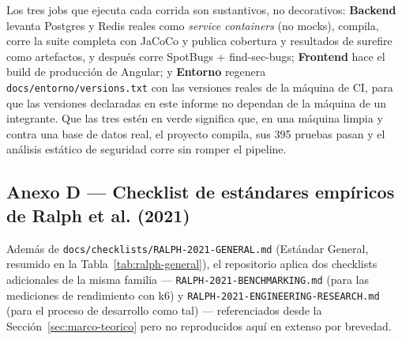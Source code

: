 Los tres jobs que ejecuta cada corrida son sustantivos, no decorativos: \textbf{Backend} levanta
Postgres y Redis reales como \textit{service containers} (no mocks), compila, corre la suite completa
con JaCoCo y publica cobertura y resultados de surefire como artefactos, y después corre SpotBugs +
find-sec-bugs; \textbf{Frontend} hace el build de producción de Angular; y \textbf{Entorno} regenera
\texttt{docs/entorno/versions.txt} con las versiones reales de la máquina de CI, para que las versiones
declaradas en este informe no dependan de la máquina de un integrante. Que las tres estén en verde
significa que, en una máquina limpia y contra una base de datos real, el proyecto compila, sus 395
pruebas pasan y el análisis estático de seguridad corre sin romper el pipeline.

\subsection{Anexo D --- Checklist de estándares empíricos de Ralph et al. (2021)}
\label{anexo:ralph}

Además de \texttt{docs/checklists/RALPH-2021-GENERAL.md} (Estándar General, resumido en la
Tabla~\ref{tab:ralph-general}), el repositorio aplica dos checklists adicionales de la misma familia
--- \texttt{RALPH-2021-BENCHMARKING.md} (para las mediciones de rendimiento con k6) y
\texttt{RALPH-2021-ENGINEERING-RESEARCH.md} (para el proceso de desarrollo como tal) --- referenciados
desde la Sección~\ref{sec:marco-teorico} pero no reproducidos aquí en extenso por brevedad.

